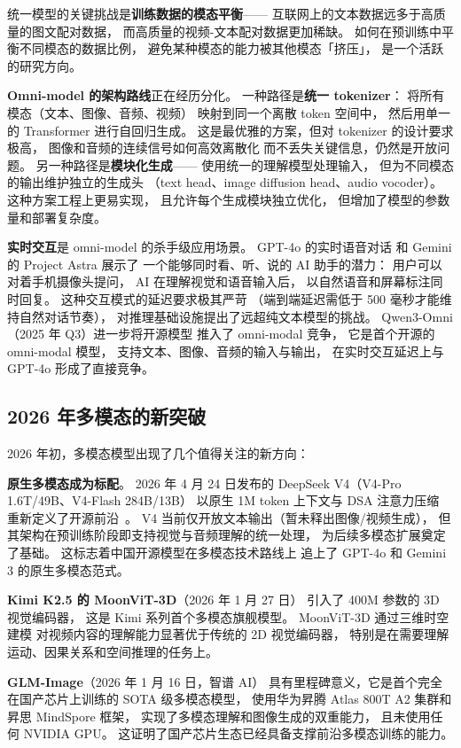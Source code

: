 统一模型的关键挑战是\textbf{训练数据的模态平衡}——
互联网上的文本数据远多于高质量的图文配对数据，
而高质量的视频-文本配对数据更加稀缺。
如何在预训练中平衡不同模态的数据比例，
避免某种模态的能力被其他模态「挤压」，
是一个活跃的研究方向。

\textbf{Omni-model 的架构路线}正在经历分化。
一种路径是\textbf{统一 tokenizer}：
将所有模态（文本、图像、音频、视频）
映射到同一个离散 token 空间中，
然后用单一的 Transformer 进行自回归生成。
这是最优雅的方案，但对 tokenizer 的设计要求极高，
图像和音频的连续信号如何高效离散化
而不丢失关键信息，仍然是开放问题。
另一种路径是\textbf{模块化生成}——
使用统一的理解模型处理输入，
但为不同模态的输出维护独立的生成头
（text head、image diffusion head、audio vocoder）。
这种方案工程上更易实现，
且允许每个生成模块独立优化，
但增加了模型的参数量和部署复杂度。

\textbf{实时交互}是 omni-model 的杀手级应用场景。
GPT-4o 的实时语音对话
和 Gemini 的 Project Astra 展示了
一个能够同时看、听、说的 AI 助手的潜力：
用户可以对着手机摄像头提问，
AI 在理解视觉和语音输入后，
以自然语音和屏幕标注同时回复。
这种交互模式的延迟要求极其严苛
（端到端延迟需低于 500 毫秒才能维持自然对话节奏），
对推理基础设施提出了远超纯文本模型的挑战。
Qwen3-Omni（2025 年 Q3）进一步将开源模型
推入了 omni-modal 竞争，
它是首个开源的 omni-modal 模型，
支持文本、图像、音频的输入与输出，
在实时交互延迟上与 GPT-4o 形成了直接竞争。

\subsection{2026 年多模态的新突破}

2026 年初，多模态模型出现了几个值得关注的新方向：

\textbf{原生多模态成为标配}。
2026 年 4 月 24 日发布的 DeepSeek V4（V4-Pro 1.6T/49B、V4-Flash 284B/13B）
以原生 1M token 上下文与 DSA 注意力压缩
重新定义了开源前沿~\cite{deepseek_v4_release_2026}。
V4 当前仅开放文本输出（暂未释出图像/视频生成），
但其架构在预训练阶段即支持视觉与音频理解的统一处理，
为后续多模态扩展奠定了基础。
这标志着中国开源模型在多模态技术路线上
追上了 GPT-4o 和 Gemini 3 的原生多模态范式。

\textbf{Kimi K2.5 的 MoonViT-3D}（2026 年 1 月 27 日）
引入了 400M 参数的 3D 视觉编码器，
这是 Kimi 系列首个多模态旗舰模型。
MoonViT-3D 通过三维时空建模
对视频内容的理解能力显著优于传统的 2D 视觉编码器，
特别是在需要理解运动、因果关系和空间推理的任务上。

\textbf{GLM-Image}（2026 年 1 月 16 日，智谱 AI）
具有里程碑意义，它是首个完全在国产芯片上训练的
SOTA 级多模态模型，
使用华为昇腾 Atlas 800T A2 集群和昇思 MindSpore 框架，
实现了多模态理解和图像生成的双重能力，
且未使用任何 NVIDIA GPU。
这证明了国产芯片生态已经具备支撑前沿多模态训练的能力。

